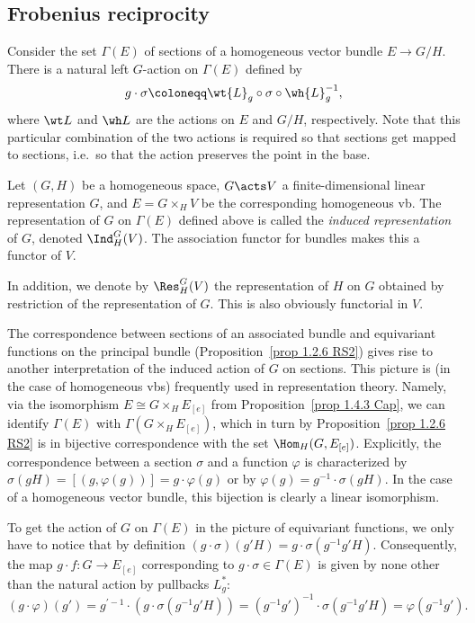 \subsection{Frobenius reciprocity}

Consider the set $\Gamma(E)$ of sections of a homogeneous vector bundle $E\to G\slash H$. There is a natural left $G$-action on $\Gamma(E)$ defined by
\[g\cdot \sigma\coloneqq \wt{L}_g\circ \sigma\circ\wh{L}^{-1}_g,\]
where $\wt L$ and $\wh L$ are the actions on $E$ and $G\slash H$, respectively. Note that this particular combination of the two actions is required so that sections get mapped to sections, i.e.\ so that the action preserves the point in the base.

\begin{defn}
    Let $(G,H)$ be a homogeneous space, $G\acts V$ a finite-dimensional linear representation $G$, and $E=G\times_H V$ be the corresponding homogeneous \gls{vb}. The representation of $G$ on $\Gamma(E)$ defined above is called the \emph{induced representation} of $G$, denoted $\Ind^G_H(V)$. The association functor for bundles makes this a functor of $V$.

    In addition, we denote by $\Res^G_H(V)$ the representation of $H$ on $G$ obtained by restriction of the representation of $G$. This is also obviously functorial in $V$.
\end{defn}

The correspondence between sections of an associated bundle and equivariant functions on the principal bundle (Proposition~\ref{prop 1.2.6 RS2}) gives rise to another interpretation of the induced action of $G$ on sections. This picture is (in the case of homogeneous \glspl{vb}) frequently used in representation theory. Namely, via the isomorphism $E\cong G\times_H E_{[e]}$ from Proposition~\ref{prop 1.4.3 Cap}, we can identify $\Gamma(E)$ with $\Gamma(G\times_H E_{[e]})$, which in turn by Proposition~\ref{prop 1.2.6 RS2} is in bijective correspondence with the set $\Hom_H(G,E_{[e]})$. Explicitly, the correspondence between a section $\sigma$ and a function $\varphi$ is characterized by $\sigma(gH)=[(g,\varphi(g))]=g\cdot \varphi(g)$ or by $\varphi(g)=g^{-1}\cdot\sigma(gH)$. In the case of a homogeneous vector bundle, this bijection is clearly a linear isomorphism.

To get the action of $G$ on $\Gamma(E)$ in the picture of equivariant functions, we only have to notice that by definition $(g\cdot \sigma)(g'H)=g\cdot \sigma(g^{-1}g'H)$. Consequently, the map $g\cdot f:G\to E_{[e]}$ corresponding to $g\cdot\sigma\in \Gamma(E)$ is given by none other than the natural action by pullbacks $L_g^\ast$:
\[(g\cdot \varphi)(g')=g^{\prime-1}\cdot(g\cdot\sigma(g^{-1}g'H))=(g^{-1}g')^{-1}\cdot\sigma(g^{-1}g'H)=\varphi(g^{-1}g').\]

